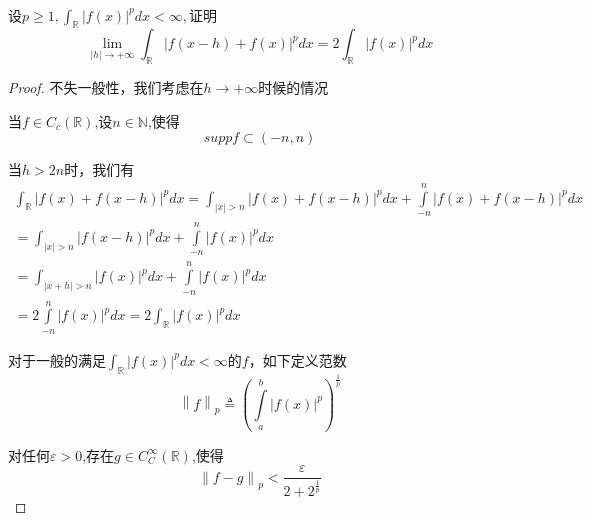 \documentclass[lang=cn,10pt]{elegantbook}
\begin{document}
	\begin{exercise}
		$\text{设}p\ge 1,\int_{\mathbb{R}}{|f\left( x \right) |^pdx}<\infty ,\text{证明}$
		\begin{equation*}
			\lim_{|h|\rightarrow +\infty} \int_{\mathbb{R}}{|f\left( x-h \right) +f\left( x \right) |^pdx}=2\int_{\mathbb{R}}{|f\left( x \right) |^pdx}
		\end{equation*}
	\end{exercise}
	\begin{proof}
		
		不失一般性，我们考虑在$h\rightarrow +\infty$时候的情况
		
		当$f\in C_{c}(\mathbb{R})$,设$n\in \mathbb{N}$,使得
		\begin{equation*}
			suppf\subset (-n,n)
		\end{equation*}
		
		当$h>2n$时，我们有
		\begin{equation*}
			\begin{split}
				\int_{\mathbb{R}}{|f\left( x \right) +f\left( x-h \right) |^pdx}=\int_{|x|>n}{|f\left( x \right) +f\left( x-h \right) |^pdx}+\int\limits_{-n}^n{|f\left( x \right) +f\left( x-h \right) |^pdx}
				\\
				=\int_{|x|>n}{|f\left( x-h \right) |^pdx}+\int\limits_{-n}^n{|f\left( x \right) |^pdx}
				\\
				=\int_{|x+h|>n}{|f\left( x \right) |^pdx}+\int\limits_{-n}^n{|f\left( x \right) |^pdx}
				\\
				=2\int\limits_{-n}^n{|f\left( x \right) |^pdx}=2\int_{\mathbb{R}}{|f\left( x \right) |^pdx}
			\end{split}
		\end{equation*}
		
		对于一般的满足$\int_{\mathbb{R}}{|f\left( x \right) |^pdx}<\infty$的$f$，如下定义范数
		\begin{equation*}
			\left\| f \right\| _p\triangleq \left( \int\limits_a^b{|f\left( x \right) |^p} \right) ^{\frac{1}{p}}
		\end{equation*}
		
		对任何$\varepsilon >0$,存在$g\in C_{C}^{\infty}\left( \mathbb{R} \right) $,使得
		\begin{equation*}
			\left\| f-g \right\| _p<\frac{\varepsilon}{2+2^{\frac{1}{p}}}
		\end{equation*}
		

\end{proof}
\end{document}
